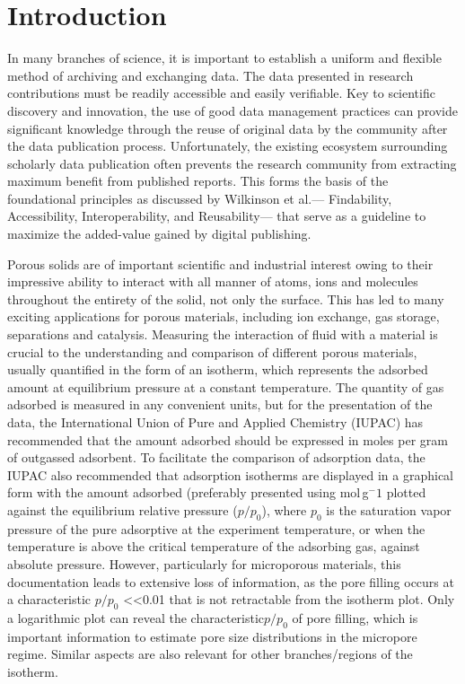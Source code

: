 \documentclass[journal=langd5,manuscript=article]{achemso}
\begin{document}
\section{Introduction}
In many branches of science, it is important to establish a uniform and flexible method of archiving and exchanging data.
The data presented in research contributions must be readily accessible and easily verifiable.\cite{10.1021/acs.langmuir.9b02963}
Key to scientific discovery and innovation, the use of good data management practices can provide significant knowledge through the reuse of original data by the community after the data publication process.\cite{10.1002/adts.201900131}
Unfortunately, the existing ecosystem surrounding scholarly data publication often prevents the research community from extracting maximum benefit from published reports.
This forms the basis of the foundational principles as discussed by Wilkinson et al.--- Findability, Accessibility, Interoperability, and Reusability--- that serve as a guideline to maximize the added-value gained by digital publishing.\cite{10.1038/sdata.2016.18}

Porous solids are of important scientific and industrial interest owing to their impressive ability to interact with all manner of atoms, ions and molecules throughout the entirety of the solid, not only the surface.\cite{10.1038/nature00785}
This has led to many exciting applications for porous materials, including ion exchange, gas storage, separations and catalysis.\cite{10.1039/C6CS00135A}
Measuring the interaction of fluid with a material is crucial to the understanding and comparison of different porous materials, usually quantified in the form of an isotherm, which represents the adsorbed amount at equilibrium pressure at a constant temperature.
The quantity of gas adsorbed is measured in any convenient units, but for the presentation of the data, the International Union of Pure and Applied Chemistry (IUPAC) has recommended that the amount adsorbed should be expressed in moles per gram of outgassed adsorbent.\cite{10.1515/pac-2014-1117}
To facilitate the comparison of adsorption data, the IUPAC also recommended that adsorption isotherms are displayed in a graphical form with the amount adsorbed (preferably presented using mol$\,$g$^-1$ plotted against the equilibrium relative pressure ($p/p_0$), where $p_0$ is the saturation vapor pressure of the pure adsorptive at the experiment temperature, or when the temperature is above the critical temperature of the adsorbing gas, against absolute pressure.
However, particularly for microporous materials, this documentation leads to extensive loss of information, as the pore filling occurs at a characteristic $p/p_0$ \textless\textless 0.01 that is not retractable from the isotherm plot.
Only a logarithmic plot can reveal the characteristic$ p/p_0$ of pore filling, which is important information to estimate pore size distributions in the micropore regime.
Similar aspects are also relevant for other branches/regions of the isotherm. 
\end{document}
